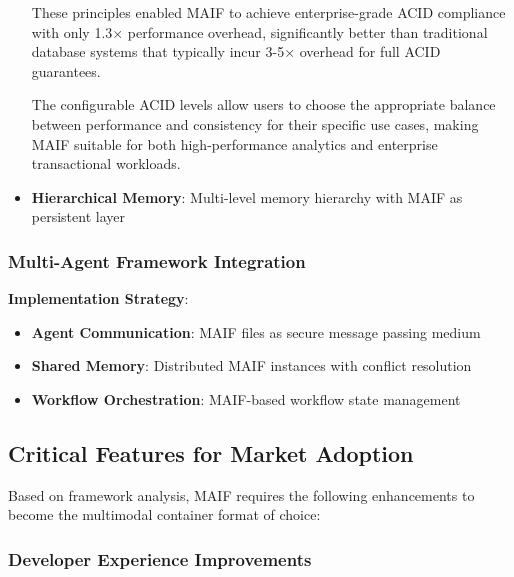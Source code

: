 \documentclass[conference]{IEEEtran}
\begin{document}
\begin{itemize}[leftmargin=*]
These principles enabled MAIF to achieve enterprise-grade ACID compliance with only 1.3× performance overhead, significantly better than traditional database systems that typically incur 3-5× overhead for full ACID guarantees.

The configurable ACID levels allow users to choose the appropriate balance between performance and consistency for their specific use cases, making MAIF suitable for both high-performance analytics and enterprise transactional workloads.
\item \textbf{Hierarchical Memory}: Multi-level memory hierarchy with MAIF as persistent layer
\end{itemize}

\subsubsection{Multi-Agent Framework Integration}

\textbf{Implementation Strategy}:
\begin{itemize}[leftmargin=*]
\item \textbf{Agent Communication}: MAIF files as secure message passing medium
\item \textbf{Shared Memory}: Distributed MAIF instances with conflict resolution
\item \textbf{Workflow Orchestration}: MAIF-based workflow state management
\end{itemize}

\subsection{Critical Features for Market Adoption}

Based on framework analysis, MAIF requires the following enhancements to become the multimodal container format of choice:

\subsubsection{Developer Experience Improvements}
\end{document}
